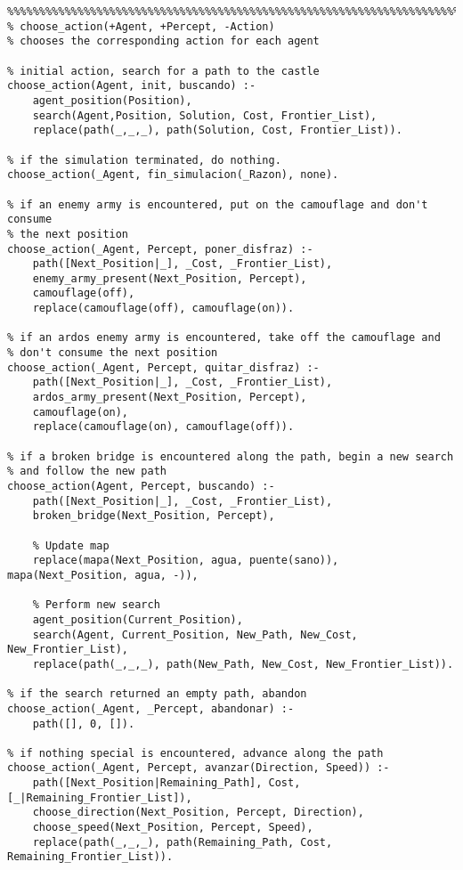 \documentclass[a4paper,12pt]{report}
\begin{document}
\begin{verbatim}
%%%%%%%%%%%%%%%%%%%%%%%%%%%%%%%%%%%%%%%%%%%%%%%%%%%%%%%%%%%%%%%%%%%%%%%%%%%%%%%
% choose_action(+Agent, +Percept, -Action)
% chooses the corresponding action for each agent

% initial action, search for a path to the castle
choose_action(Agent, init, buscando) :-
    agent_position(Position),
    search(Agent,Position, Solution, Cost, Frontier_List),
    replace(path(_,_,_), path(Solution, Cost, Frontier_List)).

% if the simulation terminated, do nothing.
choose_action(_Agent, fin_simulacion(_Razon), none).

% if an enemy army is encountered, put on the camouflage and don't consume
% the next position
choose_action(_Agent, Percept, poner_disfraz) :-
    path([Next_Position|_], _Cost, _Frontier_List),
    enemy_army_present(Next_Position, Percept),
    camouflage(off),
    replace(camouflage(off), camouflage(on)).

% if an ardos enemy army is encountered, take off the camouflage and
% don't consume the next position
choose_action(_Agent, Percept, quitar_disfraz) :-
    path([Next_Position|_], _Cost, _Frontier_List),
    ardos_army_present(Next_Position, Percept),
    camouflage(on),
    replace(camouflage(on), camouflage(off)).

% if a broken bridge is encountered along the path, begin a new search
% and follow the new path
choose_action(Agent, Percept, buscando) :-
    path([Next_Position|_], _Cost, _Frontier_List),
    broken_bridge(Next_Position, Percept),

    % Update map
    replace(mapa(Next_Position, agua, puente(sano)), mapa(Next_Position, agua, -)),

    % Perform new search
    agent_position(Current_Position),
    search(Agent, Current_Position, New_Path, New_Cost, New_Frontier_List),
    replace(path(_,_,_), path(New_Path, New_Cost, New_Frontier_List)).

% if the search returned an empty path, abandon
choose_action(_Agent, _Percept, abandonar) :-
    path([], 0, []).

% if nothing special is encountered, advance along the path
choose_action(_Agent, Percept, avanzar(Direction, Speed)) :-
    path([Next_Position|Remaining_Path], Cost, [_|Remaining_Frontier_List]),
    choose_direction(Next_Position, Percept, Direction),
    choose_speed(Next_Position, Percept, Speed),
    replace(path(_,_,_), path(Remaining_Path, Cost, Remaining_Frontier_List)).

\end{verbatim}
\end{document}
